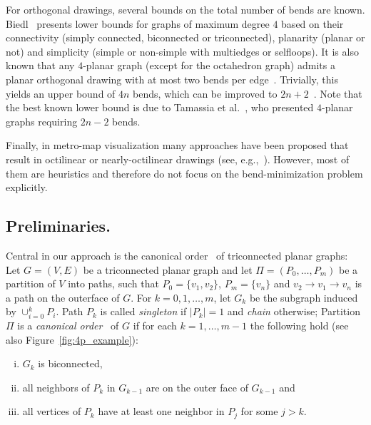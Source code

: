 \documentclass[a4paper,twoside,11pt]{article}
\begin{document}
For orthogonal drawings, several bounds on the total number of bends
are known. Biedl~\cite{Bie96} presents lower bounds for graphs of
maximum degree $4$ based on their connectivity (simply connected,
biconnected or triconnected), planarity (planar or not) and
simplicity (simple or non-simple with multiedges or selfloops). It
is also known that any $4$-planar graph (except for the octahedron
graph) admits a planar orthogonal drawing with at most two bends per
edge~\cite{BK94,LMS98}. Trivially, this yields an upper bound of
$4n$ bends, which can be improved to $2n+2$~\cite{BK94}. Note that
the best known lower bound is due to Tamassia et al.~\cite{TTV91},
who presented $4$-planar graphs requiring $2n-2$ bends.

Finally, in metro-map visualization many approaches have been
proposed that result in octilinear or nearly-octilinear drawings
(see, e.g.,~\cite{HMN06,Noellenburg05,NW11,SROW11}). However, most
of them are heuristics and therefore do not focus on the
bend-minimization problem explicitly.


\subsection{Preliminaries.}
\label{sec:preliminaries}
Central in our approach is the canonical order~\cite{FPP90,Kant92b}
of triconnected planar graphs: Let $G=(V,E)$ be a triconnected
planar graph and let $\Pi = (P_0,\ldots,P_m)$ be a partition of $V$
into paths, such that $P_0 = \{v_1,v_2\}$, $P_m=\{v_n\}$ and $v_2
\rightarrow v_1 \rightarrow v_n$ is a path on the outerface of $G$.
For $k=0,1,\ldots,m$, let $G_k$ be the subgraph induced by
$\cup_{i=0}^k P_i$. Path $P_k$ is called \emph{singleton} if
$|P_k|=1$ and \emph{chain} otherwise;  Partition $\Pi$ is a
\emph{canonical order}~\cite{FPP90,Kant92b} of $G$ if for each
$k=1,\ldots,m-1$ the following hold (see also
Figure~\ref{fig:4p_example}):

\begin{enumerate}[(i)] 
\item $G_k$ is biconnected, 
\item all neighbors of $P_k$ in $G_{k-1}$ are on the outer face of
$G_{k-1}$ and
\item all vertices of $P_k$ have at least one neighbor in $P_j$ for
some $j > k$.
\end{enumerate}
\end{document}
